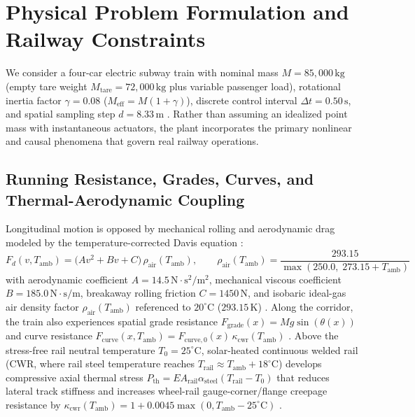 \documentclass[10pt,a4paper]{article}
\begin{document}
\section{Physical Problem Formulation and Railway Constraints}
\label{sec:physics}

We consider a four-car electric subway train with nominal mass $M = 85,000\,\text{kg}$ (empty tare weight $M_{\text{tare}} = 72,000\,\text{kg}$ plus variable passenger load), rotational inertia factor $\gamma = 0.08$ ($M_{\text{eff}} = M(1+\gamma)$), discrete control interval $\Delta t = 0.50\,\text{s}$, and spatial sampling step $d = 8.33\,\text{m}$ \cite{ref1, ref2}. Rather than assuming an idealized point mass with instantaneous actuators, the plant incorporates the primary nonlinear and causal phenomena that govern real railway operations.

\subsection{Running Resistance, Grades, Curves, and Thermal-Aerodynamic Coupling}
Longitudinal motion is opposed by mechanical rolling and aerodynamic drag modeled by the temperature-corrected Davis equation \cite{ref1, ref2, ref23}:
\begin{equation}
F_d(v, T_{\text{amb}}) = \big(A v^2 + B v + C\big)\,\rho_{\text{air}}(T_{\text{amb}}), \qquad \rho_{\text{air}}(T_{\text{amb}}) = \frac{293.15}{\max(250.0, \; 273.15 + T_{\text{amb}})}
\label{eq:davis_temp}
\end{equation}
with aerodynamic coefficient $A = 14.5\,\text{N}\cdot\text{s}^2/\text{m}^2$, mechanical viscous coefficient $B = 185.0\,\text{N}\cdot\text{s}/\text{m}$, breakaway rolling friction $C = 1450\,\text{N}$, and isobaric ideal-gas air density factor $\rho_{\text{air}}(T_{\text{amb}})$ referenced to $20^\circ\text{C}$ ($293.15\,\text{K}$) \cite{ref23}. Along the corridor, the train also experiences spatial grade resistance $F_{\text{grade}}(x) = M g \sin(\theta(x))$ and curve resistance $F_{\text{curve}}(x, T_{\text{amb}}) = F_{\text{curve},0}(x)\,\kappa_{\text{cwr}}(T_{\text{amb}})$ \cite{ref1, ref2, ref27}. Above the stress-free rail neutral temperature $T_0 = 25^\circ\text{C}$, solar-heated continuous welded rail (CWR, where rail steel temperature reaches $T_{\text{rail}} \approx T_{\text{amb}} + 18^\circ\text{C}$) develops compressive axial thermal stress $P_{\text{th}} = E A_{\text{rail}}\alpha_{\text{steel}}(T_{\text{rail}} - T_0)$ that reduces lateral track stiffness and increases wheel-rail gauge-corner/flange creepage resistance by $\kappa_{\text{cwr}}(T_{\text{amb}}) = 1 + 0.0045\max(0, T_{\text{amb}} - 25^\circ\text{C})$ \cite{ref27, ref28}.
\end{document}
